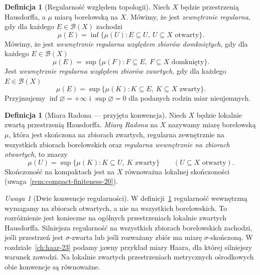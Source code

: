 \documentclass[11pt,a4paper,oneside]{book}
\numberwithin{equation}{chapter}
\theoremstyle{plain}
\theoremstyle{definition}
\newtheorem{definicja}[twierdzenie]{Definicja}
\theoremstyle{remark}
\newtheorem{uwaga}[twierdzenie]{Uwaga}
\begin{document}
\begin{definicja}[Regularność względem topologii]
\label{def:regularity-20}
Niech $X$ będzie przestrzenią Hausdorffa, a $\mu$ miarą
borelowską na $X$. Mówimy, że jest
\emph{zewnętrznie regularna}, gdy dla każdego
$E\in\mathcal B(X)$ zachodzi
\begin{equation}\label{eq:outer-regular-20}
 \mu(E)=\inf\{\mu(U):E\subseteq U,\ U\subseteq X
 \text{ otwarty}\}.
\end{equation}
Mówimy, że jest \emph{wewnętrznie regularna względem
zbiorów domkniętych}, gdy dla każdego $E\in\mathcal B(X)$
\[
 \mu(E)=\sup\{\mu(F):F\subseteq E,\ F\subseteq X
 \text{ domknięty}\}.
\]
Jest \emph{wewnętrznie regularna względem zbiorów zwartych},
gdy dla każdego $E\in\mathcal B(X)$
\begin{equation}\label{eq:inner-compact-20}
 \mu(E)=\sup\{\mu(K):K\subseteq E,\ K\subseteq X
 \text{ zwarty}\}.
\end{equation}
Przyjmujemy $\inf\varnothing=+\infty$ i
$\sup\varnothing=0$ dla podanych rodzin miar nieujemnych.
\end{definicja}

\begin{definicja}[Miara Radona --- przyjęta konwencja]
\label{def:radon-measure-20}
Niech $X$ będzie lokalnie zwartą przestrzenią Hausdorffa.
\emph{Miarą Radona} na $X$ nazywamy miarę borelowską $\mu$,
która jest skończona na zbiorach zwartych, regularna
zewnętrznie na wszystkich zbiorach borelowskich oraz
\emph{regularna wewnętrznie na zbiorach otwartych}, to znaczy
\[
 \mu(U)=\sup\{\mu(K): K\subseteq U,\ K\text{ zwarty}\}
 \qquad(U\subseteq X\text{ otwarty}).
\]
Skończoność na kompaktach jest na $X$ równoważna
lokalnej skończoności (uwaga~\ref{rem:compact-finiteness-20}).
\end{definicja}

\begin{uwaga}[Dwie konwencje regularności]
W definicji~\ref{def:radon-measure-20} regularność
wewnętrzną wymagamy na zbiorach otwartych, a nie na wszystkich
borelowskich. To rozróżnienie jest konieczne na ogólnych
przestrzeniach lokalnie zwartych Hausdorffa. Silniejsza
regularność na wszystkich zbiorach borelowskich zachodzi,
jeśli przestrzeń jest $\sigma$-zwarta lub jeśli rozważany
zbiór ma miarę $\sigma$-skończoną.
W rozdziale~\ref{ch:haar-23} podamy jawny przykład
miary Haara, dla której silniejszy warunek zawodzi.
Na lokalnie zwartych przestrzeniach metrycznych ośrodkowych
obie konwencje są równoważne.
\end{uwaga}
\end{document}
